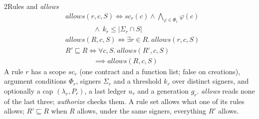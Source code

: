 \begin{perchdefinition}{2}{Rules and \emph{allows}}\label{def:rules-and-allows}
\[\begin{aligned}&\mathit{allows}(r, c, S) \iff \mathit{sc}_r(c) \land \bigwedge_{\varphi \in \Phi_r} \varphi(c)\\
&\qquad\qquad \land\ k_r \le |\Sigma_r \cap S|\\
&\mathit{allows}(R, c, S) \iff \exists r \in R.\ \mathit{allows}(r, c, S)\\
&R' \sqsubseteq R \iff \forall c, S.\ \mathit{allows}(R', c, S)\\
&\qquad\qquad \implies \mathit{allows}(R, c, S)\end{aligned}\]
A rule \(r\) has a scope \(\mathit{sc}_r\) (one contract and a function list; false on creations), argument conditions \(\Phi_r\), signers \(\Sigma_r\) and a threshold \(k_r\) over distinct signers, and optionally a cap \((\lambda_r, P_r)\), a last ledger \(u_r\) and a generation \(g_r\). \emph{allows} reads none of the last three; \emph{authorize} checks them. A rule set allows what one of its rules allows; \(R' \sqsubseteq R\) when \(R\) allows, under the same signers, everything \(R'\) allows.
\end{perchdefinition}
